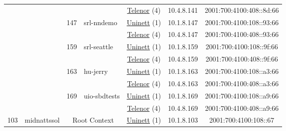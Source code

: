 \begin{small}
\begin{center}
\begin{longtable}{|c|c|c|c|c|c|c|c|}
  &  &  &  & \multicolumn{2}{|c|}{\tiny{\href{https://www.telenor.no}{Telenor} (4)}} & \tiny{10.4.8.141} & \tiny{2001:700:4100:408::8d:66} \\* \cline{3-3}\cline{4-4}\cline{5-5}\cline{6-6}\cline{7-7}\cline{8-8}
  &  & \multirow{2}{*}{\tiny{147}} & \multicolumn{1}{|l|}{\multirow{2}{*}{\tiny{srl-nndemo}}} & \multicolumn{2}{|c|}{\tiny{\href{https://www.uninett.no}{Uninett} (1)}} & \tiny{10.1.8.147} & \tiny{2001:700:4100:108::93:66} \\* \cline{5-5}\cline{6-6}\cline{7-7}\cline{8-8}
  &  &  &  & \multicolumn{2}{|c|}{\tiny{\href{https://www.telenor.no}{Telenor} (4)}} & \tiny{10.4.8.147} & \tiny{2001:700:4100:408::93:66} \\* \cline{3-3}\cline{4-4}\cline{5-5}\cline{6-6}\cline{7-7}\cline{8-8}
  &  & \multirow{2}{*}{\tiny{159}} & \multicolumn{1}{|l|}{\multirow{2}{*}{\tiny{srl-seattle}}} & \multicolumn{2}{|c|}{\tiny{\href{https://www.uninett.no}{Uninett} (1)}} & \tiny{10.1.8.159} & \tiny{2001:700:4100:108::9f:66} \\* \cline{5-5}\cline{6-6}\cline{7-7}\cline{8-8}
  &  &  &  & \multicolumn{2}{|c|}{\tiny{\href{https://www.telenor.no}{Telenor} (4)}} & \tiny{10.4.8.159} & \tiny{2001:700:4100:408::9f:66} \\* \cline{3-3}\cline{4-4}\cline{5-5}\cline{6-6}\cline{7-7}\cline{8-8}
  &  & \multirow{2}{*}{\tiny{163}} & \multicolumn{1}{|l|}{\multirow{2}{*}{\tiny{hu-jerry}}} & \multicolumn{2}{|c|}{\tiny{\href{https://www.uninett.no}{Uninett} (1)}} & \tiny{10.1.8.163} & \tiny{2001:700:4100:108::a3:66} \\* \cline{5-5}\cline{6-6}\cline{7-7}\cline{8-8}
  &  &  &  & \multicolumn{2}{|c|}{\tiny{\href{https://www.telenor.no}{Telenor} (4)}} & \tiny{10.4.8.163} & \tiny{2001:700:4100:408::a3:66} \\* \cline{3-3}\cline{4-4}\cline{5-5}\cline{6-6}\cline{7-7}\cline{8-8}
  &  & \multirow{2}{*}{\tiny{169}} & \multicolumn{1}{|l|}{\multirow{2}{*}{\tiny{uio-sbdtests}}} & \multicolumn{2}{|c|}{\tiny{\href{https://www.uninett.no}{Uninett} (1)}} & \tiny{10.1.8.169} & \tiny{2001:700:4100:108::a9:66} \\* \cline{5-5}\cline{6-6}\cline{7-7}\cline{8-8}
  &  &  &  & \multicolumn{2}{|c|}{\tiny{\href{https://www.telenor.no}{Telenor} (4)}} & \tiny{10.4.8.169} & \tiny{2001:700:4100:408::a9:66} \\ \hline
 \multirow{16}{*}{\tiny{103}} & \multicolumn{1}{|l|}{\multirow{16}{*}{\tiny{midnattssol}}} & \multicolumn{2}{|c|}{\multirow{2}{*}{\tiny{Root Context}}} & \multicolumn{2}{|c|}{\tiny{\href{https://www.uninett.no}{Uninett} (1)}} & \tiny{10.1.8.103} & \tiny{2001:700:4100:108::67} \\* \cline{5-5}\cline{6-6}\cline{7-7}\cline{8-8}

\end{longtable}
\end{center}
\end{small}
